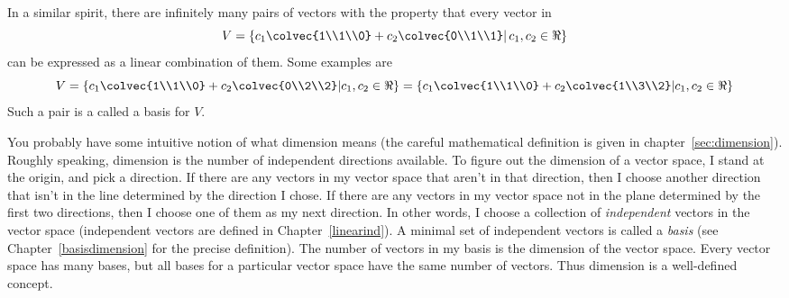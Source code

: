 In a similar spirit, there are infinitely many pairs of vectors with the property that every vector in 
$$V=\left\{  c_1\colvec{1\\1\\0} +c_2\colvec{0\\1\\1} \middle\vert \, c_1,c_2\in \Re \right\} $$ 
can be expressed as a linear combination of them. Some examples are 
$$V=
\left\{ c_1\colvec{1\\1\\0} +c_2\colvec{0\\2\\2}  \middle\vert c_1,c_2\in \Re \right\} 
=\left\{c_1 \colvec{1\\1\\0}+c_2 \colvec{1\\3\\2}  \middle\vert c_1,c_2\in \Re \right\} 
$$
Such a pair is a  called a basis for $V$.




You probably have some intuitive notion of what dimension means
(the careful mathematical definition is given in chapter~\ref{sec:dimension}).
Roughly speaking, dimension is the number of independent directions available.  To figure out the dimension of a vector space, I stand at the origin, and pick a direction.  If there are any vectors in my vector space that aren't in that direction, then I choose another direction that isn't in the line determined by the direction I chose.  If there are any vectors in my vector space not in the plane determined by the first two directions, then I choose one of them as my next direction.  In other words, I choose a collection of \emph{independent} vectors in the vector space (independent vectors are defined in Chapter~\ref{linearind}).  
A minimal set of independent vectors is called a {\it basis} (see Chapter~\ref{basisdimension} for the precise definition). 
The number of vectors in my basis is the dimension of the vector space. 
Every vector space has many bases, but all bases for a particular vector space have the same number of vectors. Thus dimension is a well-defined concept. 

